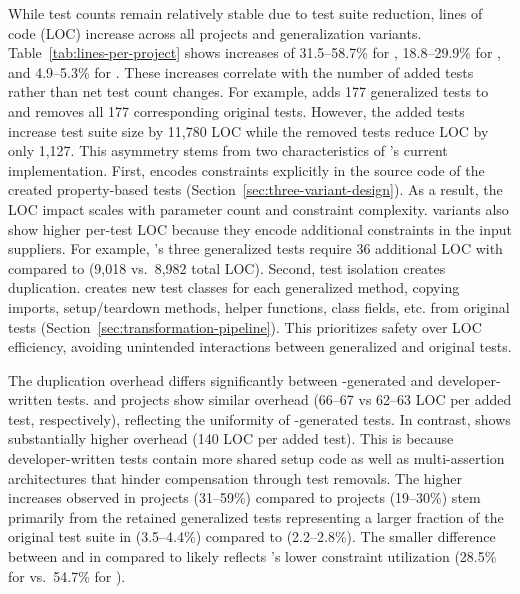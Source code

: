 While test counts remain relatively stable due to test suite reduction,
lines of code (LOC) increase across all projects and generalization variants.
Table~\ref{tab:lines-per-project} shows increases of
31.5--58.7\% for \DatasetsEqBenchEs{},
18.8--29.9\% for \DatasetsCommonsEs{},
and 4.9--5.3\% for \DatasetCommonsDev{}.
These increases correlate with the number of added tests
rather than net test count changes.
For example, \VariantNaiveC{} adds 177 generalized tests to \DatasetEqBenchA{}
and removes all 177 corresponding original tests.
However, the added tests increase test suite size by 11,780 LOC while the removed tests reduce LOC by only 1,127.
This asymmetry stems from
two characteristics of \ToolTeralizer{}'s current implementation.
First, \ToolTeralizer{} encodes constraints explicitly in the source code of the created property-based tests
(Section~\ref{sec:three-variant-design}).
As a result, the LOC impact scales with parameter count and constraint complexity.
\VariantImproved{} variants also show higher per-test LOC
because they encode additional constraints in the input suppliers.
For example, \DatasetCommonsDev{}'s three generalized tests require
36 additional LOC with \VariantImprovedC{} compared to \VariantNaiveC{}
(9,018 vs.\ 8,982 total LOC).
Second, test isolation creates duplication.
\ToolTeralizer{} creates new test classes for each generalized method,
copying imports, setup/teardown methods, helper functions, class fields, etc.
from original tests (Section~\ref{sec:transformation-pipeline}).
This prioritizes safety over LOC efficiency,
avoiding unintended interactions between generalized and original tests.



The duplication overhead differs significantly between \ToolEvoSuite{}-generated and developer-written tests.
\DatasetsEqBenchEs{} and \DatasetsCommonsEs{} projects show similar overhead
(66--67 vs 62--63 LOC per added test, respectively),
reflecting the uniformity of \ToolEvoSuite{}-generated tests.
In contrast, \DatasetCommonsDev{} shows substantially higher overhead
(140 LOC per added test).
This is because developer-written tests contain more shared setup code
as well as multi-assertion architectures that hinder compensation through test removals.
The higher increases observed in \DatasetsEqBenchEs{} projects (31--59\%) compared to \DatasetsCommonsEs{} projects (19--30\%)
stem primarily from the retained generalized tests representing a larger fraction of the original test suite
in \DatasetsEqBenchEs{} (3.5--4.4\%) compared to \DatasetsCommonsEs{} (2.2--2.8\%).
The smaller difference between \VariantNaive{} and \VariantImproved{}
in \DatasetsCommonsEs{} compared to \DatasetsEqBenchEs{}
likely reflects \VariantImproved{}'s lower constraint utilization 
(28.5\% for \DatasetsCommonsEs{} vs.\ 54.7\% for \DatasetsEqBenchEs{}).

